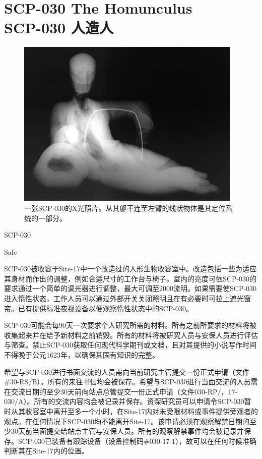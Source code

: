 \chapter[SCP-030 人造人]{
    SCP-030 The Homunculus\\
    SCP-030 人造人
}

\label{chap:SCP-030}

\begin{figure}[H]
    \centering
    \includegraphics[width=0.5\linewidth]{images/SCP-030.jpg}
    \caption*{一张SCP-030的X光照片。从其躯干连至左臂的线状物体是其定位系统的一部分。}
\end{figure}

SCP-030

Safe

SCP-030被收容于Site-17中一个改造过的人形生物收容室中。改造包括一些为适应其身材而作出的调整，例如合适尺寸的工作台与椅子。室内的亮度可依SCP-030的要求通过一个简单的调光器进行调整，最大可调至2000流明。如果需要使SCP-030进入惰性状态，工作人员可以通过外部开关关闭照明且在有必要时可拉上遮光窗帘。已有提供标准夜视设备以便观察惰性状态中的SCP-030。

SCP-030可能会每90天一次要求个人研究所需的材料。所有之前所要求的材料将被收集起来并在给予新材料之前销毁。所有的材料将被研究人员与安保人员进行评估与筛查。禁止SCP-030获取任何现代科学期刊或文档，且对其提供的小说写作时间不得晚于公元1623年，以确保其固有知识的完整。

希望与SCP-030进行书面交流的人员需向当前研究主管提交一份正式申请（文件\#30-RS\slash B）。所有的来往书信均会被保存。希望与SCP-030进行当面交流的人员需在交流日期的至少30天前向站点总管提交一份正式申请（文件030-RP\slash ，17-030\slash A）。所有的交流内容均会被记录并保存。资深研究员可以申请令SCP-030暂时从其收容室中离开至多一个小时，在Site-17内对未受限材料或事件提供旁观者的观点。在任何情况下SCP-030均不能离开Site-17。该申请必须在观察解禁日期的至少30天前当面提交给站点主管与安保人员。所有的观察解禁事件均会被记录并保存。SCP-030已装备有跟踪设备（设备控制码\#030-17-1），故可以在任何时候准确判断其在Site-17内的位置。

